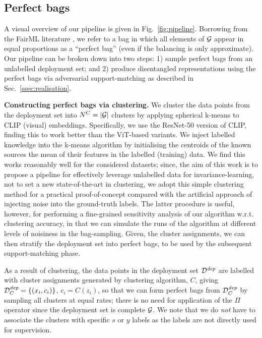 \subsection{Perfect bags}\label{sec:implementation}
%
A visual overview of our pipeline is given in Fig.~\ref{fig:pipeline}. 
%
Borrowing from the FairML literature \citep{chouldechova17,KleMulRag16}, we refer to a bag in which
all elements of ${\mathcal{G}}$ appear in equal proportions as a ``perfect bag'' (even if the balancing is
only approximate). 
%
Our pipeline can be broken down into two steps: 1) sample perfect bags from an unlabelled
deployment set; and 2) produce disentangled representations using the perfect bags via adversarial
support-matching as described in Sec.~\ref{ssec:realisation}.

\textbf{Constructing perfect bags via clustering.}
%
We cluster the data points from the deployment set into \( N^C=|{\mathcal{G}}| \) clusters by applying
spherical k-means to CLIP \cite{radford2021learning} (visual) embeddings. 
%
Specifically, we use the ResNet-50 version of CLIP, finding this to work better than the ViT-based
variants. 
%
We inject labelled knowledge into the k-means algorithm by initialising the centroids of the known
sources the mean of their features in the labelled (training) data. 
%
We find this works reasonably well for the considered datasets; since, the aim of this work is to
propose a pipeline for effectively leverage unlabelled data for invariance-learning, not to set a
new state-of-the-art in clustering, we adopt this simple clustering method for a practical
proof-of-concept compared with the artificial approach of injecting noise into the ground-truth
labels. 
%
The latter procedure is useful, however, for performing a fine-grained sensitivity analysis of our
algorithm w.r.t. clustering accuracy, in that we can simulate the runs of the algorithm at
different levels of noisiness in the bag-sampling. 
%
%
Given, the cluster assignments, we can then stratify the deployment set into perfect bags, to be
used by the subsequent support-matching phase.

As a result of clustering, the data points in the deployment set \( {\mathcal{D}}^\mathit{dep} \) are labelled
with cluster assignments generated by clustering algorithm, \( C \), giving
\( {\mathcal{D}}^\mathit{dep}_C=\{(x_i, c_i)\} \), \(c_i = C(z_i) \),
%
so that we can form perfect bags from \( {\mathcal{D}}^\mathit{dep}_C \) by sampling all clusters at equal rates;
there is no need for application of the $\Pi$ operator since the deployment set is complete \wrt{} ${\mathcal{G}}$.
%
We note that we do \emph{not} have to associate the clusters with specific $s$ or $y$ labels as the
labels are not directly used for supervision.

